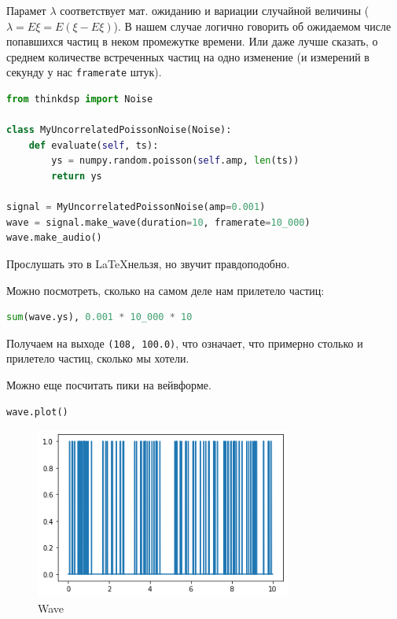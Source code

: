\documentclass[a4paper,12pt]{report}
\begin{document}
    Парамет $\lambda$ соответствует мат. ожиданию и вариации случайной величины ($\lambda = E\xi = E(\xi - E\xi)$). В нашем случае логично говорить об ожидаемом числе попавшихся частиц в неком промежутке времени. Или даже лучше сказать, о среднем количестве встреченных частиц на одно изменение (и измерений в секунду у нас \texttt{framerate} штук).
    
\begin{lstlisting}[language=Python,caption=Реализация]
from thinkdsp import Noise

class MyUncorrelatedPoissonNoise(Noise):
    def evaluate(self, ts):
        ys = numpy.random.poisson(self.amp, len(ts))
        return ys
    
signal = MyUncorrelatedPoissonNoise(amp=0.001)
wave = signal.make_wave(duration=10, framerate=10_000)
wave.make_audio()
\end{lstlisting}

    Прослушать это в \LaTeX нельзя, но звучит правдоподобно.
    
    Можно посмотреть, сколько на самом деле нам прилетело частиц:
    
\begin{lstlisting}[language=Python,caption=Подсчитываем частицы]
sum(wave.ys), 0.001 * 10_000 * 10
\end{lstlisting}

    Получаем на выходе \texttt{(108, 100.0)}, что означает, что примерно столько и прилетело частиц, сколько мы хотели.
    
    Можно еще посчитать пики на вейвформе.
    
\begin{lstlisting}[language=Python,caption=Wave]
wave.plot()
\end{lstlisting}

    \begin{figure}[H]
        \centering
        \includegraphics[width=0.75\textwidth]{ex4_wave}
        \caption{Wave}
        \label{fig:ex4_wave}
    \end{figure}
    
\end{document}
